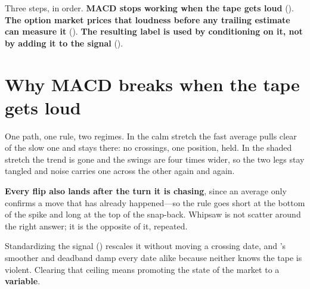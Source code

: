 

Three steps, in order. \textbf{MACD stops working when the tape gets loud}
(). \textbf{The option market prices that loudness before any trailing
estimate can measure it} (). \textbf{The resulting label is used by
conditioning on it, not by adding it to the signal} ().


\section{Why MACD breaks when the tape gets loud}\label{sec:macd-breaks}


One path, one rule, two regimes. In the calm stretch the fast average pulls clear of the slow one
and stays there: no crossings, one position, held. In the shaded stretch the trend is gone and the
swings are four times wider, so the two legs stay tangled and noise carries one across the other
again and again.

\textbf{Every flip also lands after the turn it is chasing}, since an average only confirms a move
that has already happened---so the rule goes short at the bottom of the spike and long at the top of
the snap-back. Whipsaw is not scatter around the right answer; it is the opposite of it, repeated.

Standardizing the signal () rescales it without moving a
crossing date, and 's smoother and deadband damp every date
alike because neither knows the tape is violent. Clearing that ceiling means promoting the state of
the market to a \textbf{variable}.


